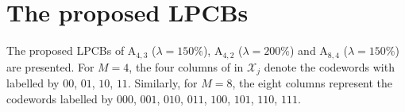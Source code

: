 \documentclass[journal]{IEEEtran}
\begin{document}
  \section{The proposed  LPCBs} 
  The proposed LPCBs of  $\text{A}_{4,3}$ ($\lambda = 150\%$), $\text{A}_{4,2}$ ($\lambda = 200\%$) and $\text{A}_{8,4}$ ($\lambda = 150\%$) are presented. %
  For  $M=4$, the four columns of in $\mathcal X_j$  denote the codewords with labelled by $00$, $01$, $10$, $11$. Similarly, for $M=8$, the  eight   columns represent the codewords labelled by $000$, $001$, $010$, $011$, $100$, $101$, $110$, $111$. %
  
  \vspace{-0.5em}
\end{document}
